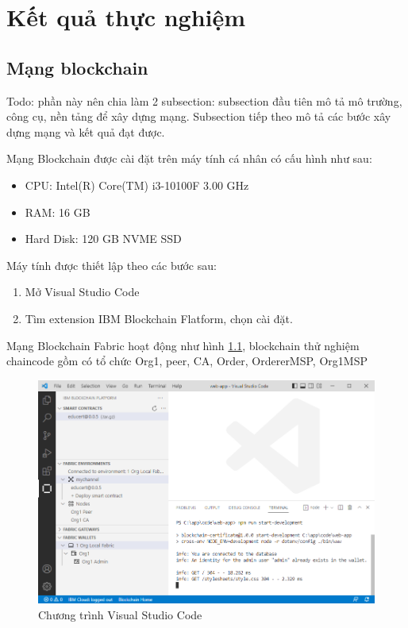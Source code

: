 \chapter{Kết quả thực nghiệm}
\section{Mạng blockchain}

{\color{red} Todo: phần này nên chia làm 2 subsection: subsection đầu tiên mô tả mô trường, công cụ, nền tảng để xây dựng mạng. Subsection tiếp theo mô tả các bước xây dựng mạng và kết quả đạt được.}

Mạng Blockchain được cài đặt  trên máy tính cá nhân có cấu hình như sau:
\begin{itemize}
\item CPU: Intel(R) Core(TM) i3-10100F 3.00 GHz
\item RAM: 16 GB
\item Hard Disk: 120 GB NVME SSD
\end{itemize}

Máy tính được thiết lập theo các bước sau:
\begin{enumerate}
\item Mở Visual Studio Code 
\item Tìm extension IBM Blockchain Flatform, chọn cài đặt.
\end{enumerate}
Mạng Blockchain Fabric hoạt động như hình \ref{fig:ide_start}, blockchain thử nghiệm chaincode gồm có tổ chức Org1, peer, CA, Order, OrdererMSP, Org1MSP

\begin{figure}[htbp]
\centering
\includegraphics[width=.9\linewidth]{img/ide_start.PNG}
\caption{Chương trình Visual Studio Code}
\label{fig:ide_start}
\end{figure}

